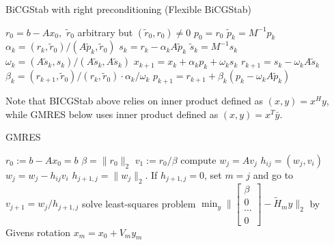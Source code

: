\documentclass[10pt]{article}
\begin{document}
\begin{algorithm}[H]
  \caption{BiCGStab with right preconditioning (Flexible BiCGStab) \citep{chen2016analysis}}\label{alg:CG}
  \begin{algorithmic}[1]
    \State $r_0=b-Ax_0,$ $\tilde{r}_0$ arbitrary but $(\tilde{r}_0,r_0)\neq 0$
    \State $p_0 = r_0$
    \State $\tilde{p}_k=M^{-1}p_k$
    \State $\alpha_k = (r_k , \tilde{r}_0 )/(A\tilde{p}_k, \tilde{r}_0 )$
    \State $s_k=r_k-\alpha_k A\tilde{p}_k$
    \State $\tilde{s}_k=M^{-1}s_k$
    \State $\omega_k = (A\tilde{s}_k , s_k )/(A\tilde{s}_k,A\tilde{s}_k ) $
    \State $x_{k+1} = x_k + \alpha_k  p_k + \omega_k s_k$
    \State $r_{k+1}=s_k-\omega_k A\tilde{s}_k$
    \State $\beta_k = (r_{k+1},\tilde{r}_0 )/(r_k,\tilde{r}_0 )\cdot \alpha_k/\omega_k$
    \State $p_{k+1}=r_{k+1}+\beta_k(p_k-\omega_k A\tilde{p}_k)$
    \EndFor
  \end{algorithmic}
\end{algorithm}

Note that BICGStab above relies on inner product defined as $(x,y)=x^H y$, while GMRES below uses inner product defined as $(x,y)=x^T\bar{y}$.
\begin{algorithm}[H]
  \caption{GMRES \citep[algorithm 6.9]{Saad_2003_IMS}}
  \begin{algorithmic}[1]
    \State $r_0:=b-A x_0=b$
    \State $\beta=\|r_0\|_2$
    \State $v_1:=r_0/\beta$
    \State compute $w_j=Av_j$
        \State $h_{ij}=(w_j,v_i)$
        \State $w_j=w_j-h_{ij} v_i$
        \EndFor
    \State $h_{j+1,j}=\|w_j\|_2$. If $h_{j+1,j}=0$, set $m=j$ and go to
    \State $v_{j+1} = w_j/h_{j+1,j}$
    \State solve least-squares problem $\min_y\|\begin{bmatrix}
    \beta\\
    0\\
    \cdots\\
    0
    \end{bmatrix}- \tilde{H}_m y\|_2$ by Givens rotation
    \EndFor
    \State $x_m = x_0+V_m y_m$
  \end{algorithmic}
\end{algorithm}
\end{document}
